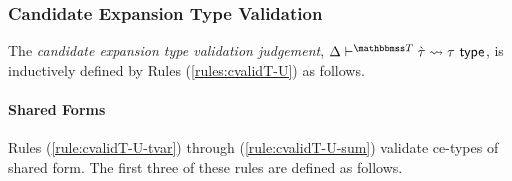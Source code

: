 \subsubsection{Candidate Expansion Type Validation}
The \emph{candidate expansion type validation judgement}, $\cvalidT{\Delta}{\tscenev}{\ctau}{\tau}$, is inductively defined by Rules (\ref*{rules:cvalidT-U}) as follows.

\paragraph{Shared Forms} Rules (\ref*{rule:cvalidT-U-tvar}) through (\ref*{rule:cvalidT-U-sum}) validate ce-types of shared form. The first three of these rules are defined as follows.
